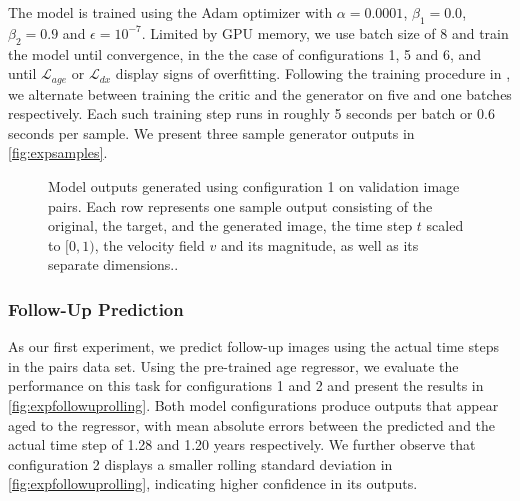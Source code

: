 The model is trained using the Adam optimizer with $\alpha = 0.0001$, $\beta_1 = 0.0$, $\beta_2 = 0.9$ and $\epsilon = 10^{-7}$. Limited by GPU memory, we use batch size of 8 and train the model until convergence, in the the case of configurations 1, 5 and 6, and until $\mathcal{L}_{age}$ or $\mathcal{L}_{dx}$ display signs of overfitting. Following the training procedure in \cite{goodfellow2014generative}, we alternate between training the critic and the generator on five and one batches respectively. Each such training step runs in roughly 5 seconds per batch or 0.6 seconds per sample. We present three sample generator outputs in \autoref{fig:expsamples}.

\begin{figure}
	\centering
	
	\vspace*{-15pt}
	\caption{Model outputs generated using configuration 1 on validation image pairs. Each row represents one sample output consisting of the original, the target, and the generated image, the time step $t$ scaled to $[0, 1)$, the velocity field $v$ and its magnitude, as well as its separate dimensions..}
	\label{fig:expsamples}
\end{figure}

\subsubsection*{Follow-Up Prediction}
As our first experiment, we predict follow-up images using the actual time steps in the pairs data set. Using the pre-trained age regressor, we evaluate the performance on this task for configurations 1 and 2 and present the results in \autoref{fig:expfollowuprolling}. Both model configurations produce outputs that appear aged to the regressor, with mean absolute errors between the predicted and the actual time step of 1.28 and 1.20 years respectively. We further observe that configuration 2 displays a smaller rolling standard deviation in \autoref{fig:expfollowuprolling}, indicating higher confidence in its outputs.


